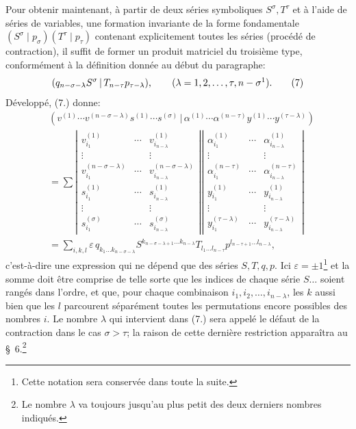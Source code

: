 \documentclass[11pt]{article}
\newcommand{\pair}[2]{(#1\,|\,#2)}
\newcommand{\eps}{\varepsilon}
\begin{document}
Pour obtenir maintenant, à partir de deux séries symboliques $S^\sigma,T^\tau$ et à l'aide de séries de variables, une formation invariante de la forme fondamentale $(S^\sigma\mid p_\sigma)(T^\tau\mid p_\tau)$ contenant explicitement toutes les séries (procédé de contraction), il suffit de former un produit matriciel du troisième type, conformément à la définition donnée au début du paragraphe:
\begin{equation}
 \pair{q_{n-\sigma-\lambda}S^\sigma}{T_{n-\tau}p_{\tau-\lambda}},
 \qquad (\lambda=1,2,\ldots,\tau,n-\sigma\footnotemark).
\tag{7}
\end{equation}
Développé, (7.) donne:
\begingroup
\setlength{\arraycolsep}{2pt}
\begin{equation}
\begin{aligned}
&\pair{v^{(1)}\cdots v^{(n-\sigma-\lambda)}s^{(1)}\cdots s^{(\sigma)}}
       {\alpha^{(1)}\cdots\alpha^{(n-\tau)}y^{(1)}\cdots y^{(\tau-\lambda)}} \\
&=\sum
\left|\begin{array}{ccc}
 v_{i_1}^{(1)}&\cdots&v_{i_{n-\lambda}}^{(1)}\\
 \vdots&&\vdots\\
 v_{i_1}^{(n-\sigma-\lambda)}&\cdots&v_{i_{n-\lambda}}^{(n-\sigma-\lambda)}\\
 s_{i_1}^{(1)}&\cdots&s_{i_{n-\lambda}}^{(1)}\\
 \vdots&&\vdots\\
 s_{i_1}^{(\sigma)}&\cdots&s_{i_{n-\lambda}}^{(\sigma)}
\end{array}\right|
\left|\begin{array}{ccc}
 \alpha_{i_1}^{(1)}&\cdots&\alpha_{i_{n-\lambda}}^{(1)}\\
 \vdots&&\vdots\\
 \alpha_{i_1}^{(n-\tau)}&\cdots&\alpha_{i_{n-\lambda}}^{(n-\tau)}\\
 y_{i_1}^{(1)}&\cdots&y_{i_{n-\lambda}}^{(1)}\\
 \vdots&&\vdots\\
 y_{i_1}^{(\tau-\lambda)}&\cdots&y_{i_{n-\lambda}}^{(\tau-\lambda)}
\end{array}\right|\\
&=\sum_{i,k,l}\eps\,q_{k_1\ldots k_{n-\sigma-\lambda}}
 S^{k_{n-\sigma-\lambda+1}\ldots k_{n-\lambda}}
 T_{l_1\ldots l_{n-\tau}}
 p^{l_{n-\tau+1}\ldots l_{n-\lambda}},
\end{aligned}
\tag{8}
\end{equation}
\endgroup
c'est-à-dire une expression qui ne dépend que des séries $S,T,q,p$. Ici $\eps=\pm1$\footnote{Cette notation sera conservée dans toute la suite.} et la somme doit être comprise de telle sorte que les indices de chaque série $S\ldots$ soient rangés dans l'ordre, et que, pour chaque combinaison $i_1,i_2,\ldots,i_{n-\lambda}$, les $k$ aussi bien que les $l$ parcourent séparément toutes les permutations encore possibles des nombres $i$. Le nombre $\lambda$ qui intervient dans (7.) sera appelé le défaut de la contraction dans le cas $\sigma>\tau$; la raison de cette dernière restriction apparaîtra au \S\ 6.\footnote{Le nombre $\lambda$ va toujours jusqu'au plus petit des deux derniers nombres indiqués.}
\end{document}
